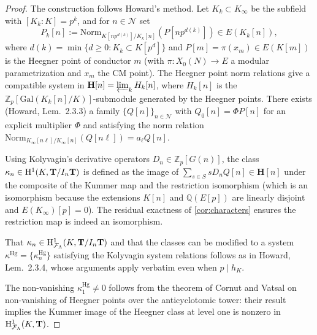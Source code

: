 \begin{proof}
  The construction follows Howard's method. Let \(K_k \subset K_\infty\) be the subfield with \([K_k : K] = p^k\), and for \(n \in \mathcal{N}\) set
  \[
    P_k[n] := \mathrm{Norm}_{K[np^{d(k)}]/K_k[n]}(P[np^{d(k)}]) \in E(K_k[n]),
  \]
  where \(d(k) = \min\{d \geq 0 : K_k \subset K[p^d]\}\) and \(P[m] = \pi(x_m) \in E(K[m])\) is the Heegner point of conductor \(m\) (with \(\pi : X_0(N) \to E\) a modular parametrization and \(x_m\) the CM point). The Heegner point norm relations give a compatible system in \(\mathbf{H}[n] = \varprojlim_k H_k[n]\), where \(H_k[n]\) is the \(\mathbb{Z}_p[\mathrm{Gal}(K_k[n]/K)]\)-submodule generated by the Heegner points. There exists (Howard, Lem.~2.3.3) a family \(\{Q[n]\}_{n \in \mathcal{N}}\) with \(Q_0[n] = \Phi P[n]\) for an explicit multiplier \(\Phi\) and satisfying the norm relation \(\mathrm{Norm}_{K_\infty[n\ell]/K_\infty[n]}(Q[n\ell]) = a_\ell Q[n]\).

  Using Kolyvagin's derivative operators \(D_n \in \mathbb{Z}_p[G(n)]\), the class \(\kappa_n \in \mathrm{H}^1(K, \mathbf{T}/I_n\mathbf{T})\) is defined as the image of \(\sum_{s \in S} s D_n Q[n] \in \mathbf{H}[n]\) under the composite of the Kummer map and the restriction isomorphism (which is an isomorphism because the extensions \(K[n]\) and \(\mathbb{Q}(E[p])\) are linearly disjoint and \(E(K_\infty)[p] = 0\)). The residual exactness of \cref{cor:characters} ensures the restriction map is indeed an isomorphism.

  That \(\kappa_n \in \mathrm{H}^1_{\mathcal{F}_\Lambda}(K, \mathbf{T}/I_n\mathbf{T})\) and that the classes can be modified to a system \(\kappa^{\mathrm{Hg}} = \{\kappa_n^{\mathrm{Hg}}\}\) satisfying the Kolyvagin system relations follows as in Howard, Lem.~2.3.4, whose arguments apply verbatim even when \(p \mid h_K\).

  The non-vanishing \(\kappa_1^{\mathrm{Hg}} \neq 0\) follows from the theorem of Cornut and Vatsal on non-vanishing of Heegner points over the anticyclotomic tower: their result implies the Kummer image of the Heegner class at level one is nonzero in \(\mathrm{H}^1_{\mathcal{F}_\Lambda}(K, \mathbf{T})\).
\end{proof}


